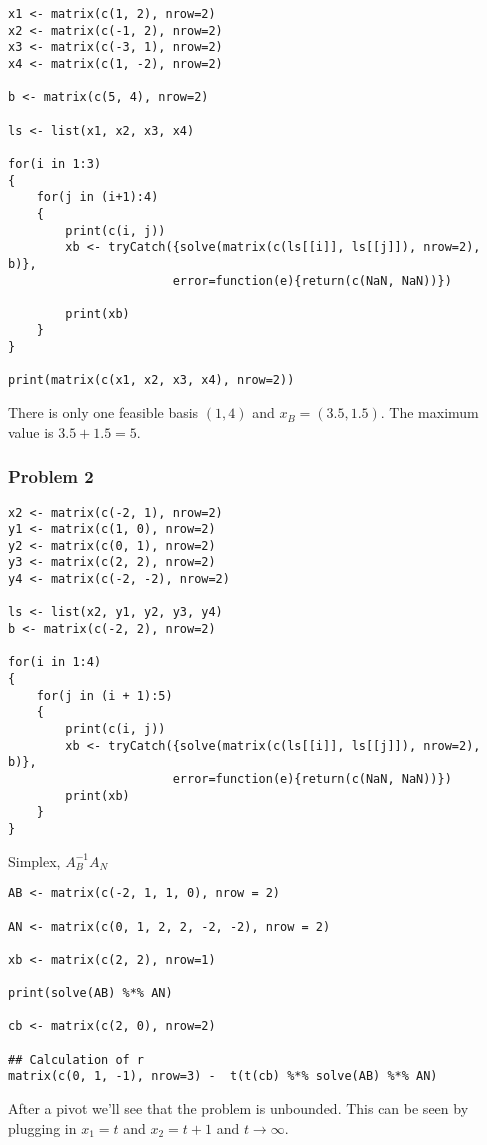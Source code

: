 \documentclass[11pt]{article}
\begin{document}
\begin{verbatim}
x1 <- matrix(c(1, 2), nrow=2)
x2 <- matrix(c(-1, 2), nrow=2)
x3 <- matrix(c(-3, 1), nrow=2)
x4 <- matrix(c(1, -2), nrow=2)

b <- matrix(c(5, 4), nrow=2)

ls <- list(x1, x2, x3, x4)

for(i in 1:3)
{
    for(j in (i+1):4)
    {
        print(c(i, j))
        xb <- tryCatch({solve(matrix(c(ls[[i]], ls[[j]]), nrow=2), b)},
                       error=function(e){return(c(NaN, NaN))})

        print(xb)
    }
}

print(matrix(c(x1, x2, x3, x4), nrow=2))
\end{verbatim}

There is only one feasible basis \((1, 4)\) and \(x_B = (3.5, 1.5)\). The
maximum value is \(3.5 + 1.5 = 5\).
\subsubsection{Problem 2}
\label{sec:org3355c50}
\begin{verbatim}
x2 <- matrix(c(-2, 1), nrow=2)
y1 <- matrix(c(1, 0), nrow=2)
y2 <- matrix(c(0, 1), nrow=2)
y3 <- matrix(c(2, 2), nrow=2)
y4 <- matrix(c(-2, -2), nrow=2)

ls <- list(x2, y1, y2, y3, y4)
b <- matrix(c(-2, 2), nrow=2)

for(i in 1:4)
{
    for(j in (i + 1):5)
    {
        print(c(i, j))
        xb <- tryCatch({solve(matrix(c(ls[[i]], ls[[j]]), nrow=2), b)},
                       error=function(e){return(c(NaN, NaN))})
        print(xb)
    }
}
\end{verbatim}

Simplex, \(A_B^{-1}A_N\)

\begin{verbatim}
AB <- matrix(c(-2, 1, 1, 0), nrow = 2)

AN <- matrix(c(0, 1, 2, 2, -2, -2), nrow = 2)

xb <- matrix(c(2, 2), nrow=1)

print(solve(AB) %*% AN)

cb <- matrix(c(2, 0), nrow=2)

## Calculation of r
matrix(c(0, 1, -1), nrow=3) -  t(t(cb) %*% solve(AB) %*% AN)
\end{verbatim}

After a pivot we'll see that the problem is unbounded. This can be seen by
plugging in \(x_1 = t\) and \(x_2 = t +1\) and \(t \rightarrow \infty\).
\end{document}
